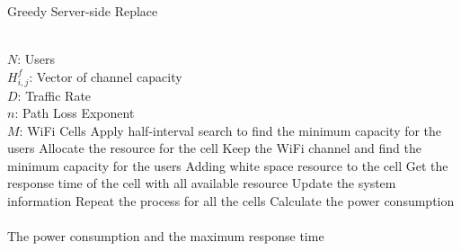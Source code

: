 \begin{algorithm}[t]
\small
\caption{Greedy Server-side Replace}
\label{algorithm:mape}
\begin{algorithmic}[1]
\REQUIRE  ~~\\
$N$: Users\\
$H_{i,j}^f$: Vector of channel capacity\\
$D$: Traffic Rate\\
$n$: Path Loss Exponent \\
$M$: WiFi Cells
\STATE Apply half-interval search to find the minimum capacity for the users
\STATE Allocate the resource for the cell
\STATE Keep the WiFi channel and find the minimum capacity for the users
\STATE Adding white space resource to the cell
\ENDIF
\ELSE 
\STATE Get the response time of the cell with all available resource
\ENDIF
\STATE Update the system information
\STATE Repeat the process for all the cells
\STATE Calculate the power consumption
\ENSURE ~~\\
The power consumption and the maximum response time\\
\end{algorithmic}
\end{algorithm}

